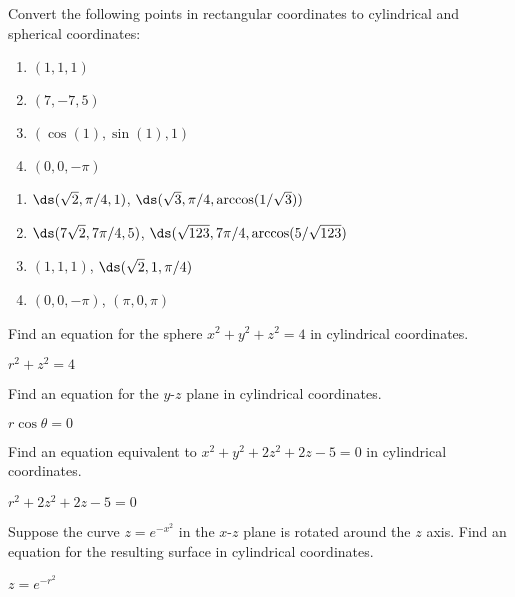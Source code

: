 \begin{enumialphparenastyle}

\begin{ex}
Convert the following points in rectangular coordinates to
cylindrical and spherical coordinates:
\begin{enumerate}
\item $(1,1,1)$
\item $(7,-7,5)$
\item $(\cos(1),\sin(1),1)$
\item $(0,0,-\pi)$
\end{enumerate}
\begin{sol}
\begin{enumerate}
	\item	$\ds (\sqrt2,\pi/4,1)$, $\ds (\sqrt3,\pi/4,\arccos(1/\sqrt3))$
	\item	$\ds (7\sqrt2,7\pi/4,5)$, $\ds (\sqrt{123},7\pi/4,\arccos(5/\sqrt{123})$
	\item	$(1,1,1)$, $\ds (\sqrt2,1,\pi/4)$
	\item	$(0,0,-\pi)$, $(\pi,0,\pi)$
\end{enumerate}
\end{sol}
\end{ex}

\begin{ex}
Find an equation for the sphere $x^2+y^2+z^2=4$ in
cylindrical coordinates.
\begin{sol}
	$r^2+z^2=4$
\end{sol}
\end{ex}

\begin{ex}
Find an equation for the $y$-$z$ plane in cylindrical
coordinates. 
\begin{sol}
	$r\cos\theta=0$
\end{sol}
\end{ex}

\begin{ex}
Find an equation equivalent to $x^2+y^2+2z^2+2z-5=0$ in
cylindrical coordinates.
\begin{sol}
	$r^2+2z^2+2z-5=0$
\end{sol}
\end{ex}

\begin{ex}
Suppose the curve $z=e^{-x^2}$ in the $x$-$z$ plane is
rotated around the $z$ axis. Find an equation for the resulting
surface in cylindrical coordinates.
\begin{sol}
	$z=e^{-r^2}$
\end{sol}
\end{ex}


\end{enumialphparenastyle}
